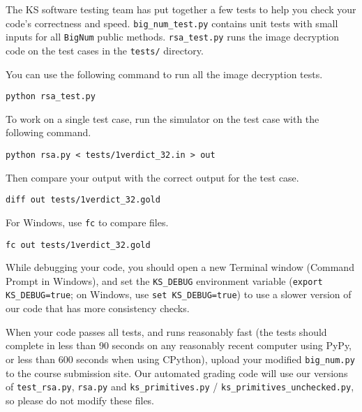 \documentclass[12pt,twoside]{article}
\begin{document}
\begin{problems}
The KS software testing team has put together a few tests to help you check your
code's correctness and speed. \texttt{big\_num\_test.py} contains unit tests
with small inputs for all \texttt{BigNum} public methods.
\texttt{rsa\_test.py} runs the image decryption code on the test cases in the
\texttt{tests/} directory.

You can use the following command to run all the image decryption tests.

\texttt{python rsa\_test.py}

To work on a single test case, run the simulator on the test case with the
following command.

\texttt{python rsa.py < tests/1verdict\_32.in > out}

Then compare your output with the correct output for the test case.

\texttt{diff out tests/1verdict\_32.gold}

For Windows, use \texttt{fc} to compare files.

\texttt{fc out tests/1verdict\_32.gold}

While debugging your code, you should open a new Terminal window (Command Prompt
in Windows), and set the \texttt{KS\_DEBUG} environment variable (\texttt{export
KS\_DEBUG=true}; on Windows, use \texttt{set KS\_DEBUG=true}) to use a slower
version of our code that has more consistency checks.

When your code passes all tests, and runs reasonably fast (the tests should
complete in less than 90 seconds on any reasonably recent computer using PyPy,
or less than 600 seconds when using CPython), upload your modified
\texttt{big\_num.py} to the course submission site. Our automated grading code
will use our versions of \texttt{test\_rsa.py}, \texttt{rsa.py} and
\texttt{ks\_primitives.py} / \texttt{ks\_primitives\_unchecked.py}, so please do
not modify these files.

\end{problems}
\end{document}
